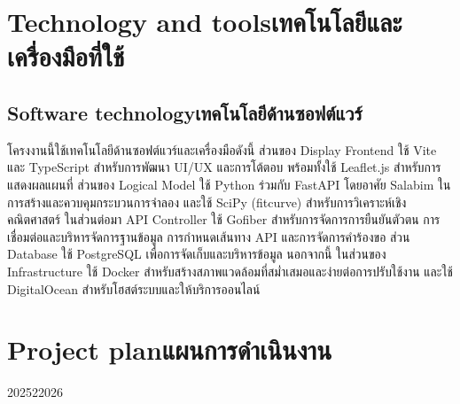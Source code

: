 \section{\ifenglish Technology and tools\else เทคโนโลยีและเครื่องมือที่ใช้\fi}

\subsection{\ifenglish Software technology\else เทคโนโลยีด้านซอฟต์แวร์\fi}
    \begin{mypara}
        \indent โครงงานนี้ใช้เทคโนโลยีด้านซอฟต์แวร์และเครื่องมือดังนี้ ส่วนของ Display Frontend ใช้ Vite และ TypeScript 
        สำหรับการพัฒนา UI/UX และการโต้ตอบ พร้อมทั้งใช้ Leaflet.js สำหรับการแสดงผลแผนที่ ส่วนของ Logical Model 
        ใช้ Python ร่วมกับ FastAPI โดยอาศัย Salabim ในการสร้างและควบคุมกระบวนการจำลอง และใช้ SciPy (fitcurve) 
        สำหรับการวิเคราะห์เชิงคณิตศาสตร์ ในส่วนต่อมา API Controller ใช้ Gofiber สำหรับการจัดการการยืนยันตัวตน 
        การเชื่อมต่อและบริหารจัดการฐานข้อมูล การกำหนดเส้นทาง API และการจัดการคำร้องขอ 
        ส่วน Database ใช้ PostgreSQL เพื่อการจัดเก็บและบริหารข้อมูล นอกจากนี้ ในส่วนของ 
        Infrastructure ใช้ Docker สำหรับสร้างสภาพแวดล้อมที่สม่ำเสมอและง่ายต่อการปรับใช้งาน และใช้ DigitalOcean 
        สำหรับโฮสต์ระบบและให้บริการออนไลน์
    \end{mypara}


\section{\ifenglish Project plan\else แผนการดำเนินงาน\fi}

\begin{plan}{6}{2025}{2}{2026}
\end{plan}

